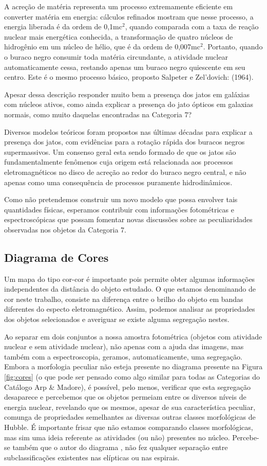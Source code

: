 A acreção de matéria representa um processo extremamente eficiente em converter matéria em energia: cálculos refinados mostram que nesse processo, a energia liberada é da ordem de 0,1mc$^{2}$, quando comparada com a taxa de reação nuclear mais energética conhecida, a transformação de quatro núcleos de hidrogênio em um núcleo de hélio, que é da ordem de 0,007mc$^{2}$. Portanto, quando o buraco negro consumir toda matéria circundante, a atividade nuclear automaticamente cessa, restando apenas um buraco negro quiescente em seu centro. Este é o mesmo processo básico, proposto Salpeter e  Zel'dovich: (1964).

Apesar dessa descrição responder muito bem a presença dos jatos em galáxias com núcleos ativos, como ainda explicar a presença do jato ópticos em galaxias normais, como muito daquelas encontradas na Categoria 7?

Diversos modelos teóricos foram propostos nas últimas décadas para explicar a presença dos jatos, com evidências para a rotação rápida dos buracos negros supermassivos. Um consenso geral esta sendo formado de que os jatos são fundamentalmente fenômenos cuja origem está relacionada aos processos eletromagnéticos no disco de acreção ao redor do buraco negro central, e não apenas como uma consequência de processos puramente hidrodinâmicos. 

Como não pretendemos construir um novo modelo que possa envolver tais quantidades físicas, esperamos contribuir com informações fotométricas e espectroscópicas que possam fomentar novas discussões sobre as peculiaridades observadas nos objetos da Categoria 7.

\subsection{Diagrama de Cores}

Um mapa do tipo cor-cor é importante pois permite obter algumas informações independentes da distância do objeto estudado. O que estamos denominando de cor neste trabalho, consiste na diferença entre o brilho do objeto em bandas
diferentes do especto eletromagnético. Assim, podemos analisar as propriedades dos objetos selecionados e averiguar se existe alguma segregação nestes. 

Ao separar em dois conjuntos a nossa amostra fotométrica (objetos com atividade nuclear e sem atividade nuclear), não apenas com a ajuda das imagens, mas também com a espectroscopia, geramos, automaticamente, uma segregação. Embora a morfologia peculiar não esteja presente no diagrama presente na Figura \ref{fig:cores} (o que pode ser pensado como algo similar para todas as Categorias do Catálogo Arp \& Madore), é possível, pelo menos, verificar que esta segregação desaparece e percebemos que os objetos permeiam entre os diversos níveis de energia nuclear, revelando que os mesmos, apesar de sua característica peculiar, comunga de propriedades semelhantes as diversas outras classes morfológicas de Hubble. É importante frisar que não estamos comparando classes morfológicas, mas sim uma ideia referente as atividades (ou não) presentes no núcleo. Percebe-se também que o autor do diagrama \cite{wright2010wide}, não fez qualquer separação entre subclassificações existentes nas elípticas ou nas espirais.

